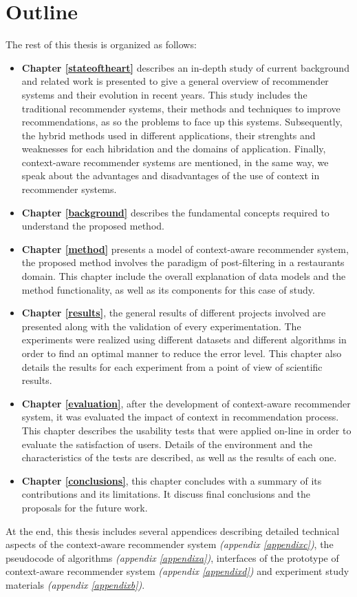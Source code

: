 \section{Outline}

The rest of this thesis is organized as follows: 
\begin{itemize}  
\item \textbf{Chapter \ref{stateoftheart}} describes an in-depth study
of current background and related work is presented to give a general
overview of recommender systems and their evolution in recent years.
This study includes the traditional recommender systems, their methods
and techniques to improve recommendations, as so the problems to face
up this systems. Subsequently, the hybrid methods used in different
applications, their strenghts and weaknesses for each hibridation and
the domains of application. Finally, context-aware recommender systems
are mentioned, in the same way, we speak about the advantages and
disadvantages of the use of context in recommender systems.
\item \textbf{Chapter \ref{background}} describes the fundamental
concepts required to understand the proposed method.
\item \textbf{Chapter \ref{method}} presents a model of context-aware
recommender system, the proposed method  involves the paradigm of
post-filtering in a restaurants domain. This chapter include the
overall explanation of data models and  the method functionality, as
well as its components for this case of study.
\item \textbf{Chapter \ref{results}}, the general results of different
projects involved are presented along with the validation of every
experimentation. The experiments were realized using different
datasets and different algorithms in order to find an optimal manner
to reduce the error level. This chapter also details the results for
each experiment from a point of view of scientific results.
\item \textbf{Chapter \ref{evaluation}}, after the development of
context-aware recommender system, it was evaluated the impact of
context in recommendation process. This chapter describes the
usability tests that were applied on-line in order to evaluate the
satisfaction of users. Details of the environment and the
characteristics of the tests are described, as well as the results of
each one.
\item \textbf{Chapter \ref{conclusions}}, this chapter concludes with a
summary of its contributions and  its limitations. It discuss final
conclusions and the proposals for the future work.
\end{itemize}  

At the end, this thesis includes several appendices describing
detailed technical aspects of the context-aware recommender system
\textit{(appendix \ref{appendixc})}, the pseudocode of algorithms
\textit{(appendix \ref{appendixa})}, interfaces of the prototype of
context-aware recommender system \textit{(appendix \ref{appendixd})}
and experiment study materials \textit{(appendix \ref{appendixb})}.

